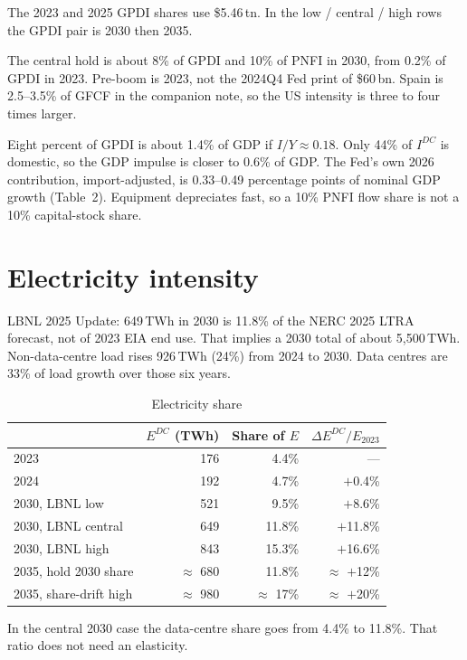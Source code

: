 \documentclass[11pt]{article}
\begin{document}
The 2023 and 2025 GPDI shares use \$5.46\,tn. In the low / central / high
rows the GPDI pair is 2030 then 2035.

The central hold is about 8\% of GPDI and 10\% of PNFI in 2030, from 0.2\%
of GPDI in 2023. Pre-boom is 2023, not the 2024Q4 Fed print of \$60\,bn.
Spain is 2.5--3.5\% of GFCF in the companion note, so the US intensity is
three to four times larger.

Eight percent of GPDI is about 1.4\% of GDP if $I/Y\approx 0.18$. Only 44\%
of $I^{DC}$ is domestic, so the GDP impulse is closer to 0.6\% of GDP. The
Fed's own 2026 contribution, import-adjusted, is 0.33--0.49 percentage points
of nominal GDP growth (Table~2). Equipment depreciates fast, so a 10\% PNFI
flow share is not a 10\% capital-stock share.

\section{Electricity intensity}
\label{sec:elec}

LBNL 2025 Update: 649\,TWh in 2030 is 11.8\% of the NERC 2025 LTRA forecast,
not of 2023 EIA end use. That implies a 2030 total of about 5{,}500\,TWh.
Non-data-centre load rises 926\,TWh (24\%) from 2024 to 2030. Data centres
are 33\% of load growth over those six years.

\begin{table}[H]
\centering
\caption{Electricity share}
\label{tab:elecshare}
\begin{tabular}{lrrr}
\toprule
 & $E^{DC}$ (TWh) & Share of $E$ & $\Delta E^{DC}/E_{2023}$ \\
\midrule
2023 & 176 & 4.4\% & --- \\
2024 & 192 & 4.7\% & $+$0.4\% \\
2030, LBNL low & 521 & 9.5\% & $+$8.6\% \\
2030, LBNL central & 649 & 11.8\% & $+$11.8\% \\
2030, LBNL high & 843 & 15.3\% & $+$16.6\% \\
2035, hold 2030 share & $\approx$ 680 & 11.8\% & $\approx$ $+$12\% \\
2035, share-drift high & $\approx$ 980 & $\approx$ 17\% & $\approx$ $+$20\% \\
\bottomrule
\end{tabular}
\end{table}

In the central 2030 case the data-centre share goes from 4.4\% to 11.8\%.
That ratio does not need an elasticity.
\end{document}
